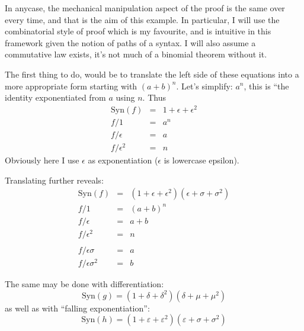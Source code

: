\documentclass[twoside]{article}
\begin{document}
In anycase, the mechanical manipulation aspect of the proof is the same over every time, and that is the aim of
this example.  In particular, I will use the combinatorial style of proof which is my favourite, and is intuitive
in this framework given the notion of paths of a syntax.  I will also assume a commutative law exists, it's not
much of a binomial theorem without it.

The first thing to do, would be to translate the left side of these equations into a more appropriate form starting
with $ (a+b)^n $.  Let's simplify: $ a^n $, this is ``the identity exponentiated from $ a $ using $ n $.  Thus
\begin{eqnarray*}
\mbox{Syn}(f) & = & 1+\epsilon+\epsilon^2 \\
f/1 & = & a^n \\
f/\epsilon & = & a \\
f/\epsilon^2 & = & n
\end{eqnarray*}
Obviously here I use $ \epsilon $ as exponentiation ($ \epsilon $ is lowercase epsilon).

Translating further reveals:
\begin{eqnarray*}
\mbox{Syn}(f) & = & (1+\epsilon+\epsilon^2)(\epsilon+\sigma+\sigma^2) \\
f/1 & = & (a+b)^n \\
f/\epsilon & = & a+b \\
f/\epsilon^2 & = & n \\
 &   & \\
f/\epsilon\sigma & = & a \\
f/\epsilon\sigma^2 & = & b
\end{eqnarray*}

The same may be done with differentiation:
$$ \mbox{Syn}(g)=(1+\delta+\delta^2)(\delta+\mu+\mu^2) $$
as well as with ``falling exponentiation'':
$$ \mbox{Syn}(h)=(1+\varepsilon+\varepsilon^2)(\varepsilon+\sigma+\sigma^2) $$
\end{document}

